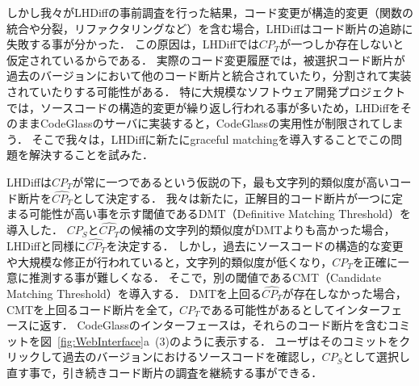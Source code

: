 しかし我々がLHDiffの事前調査を行った結果，コード変更が構造的変更（関数の統合や分裂，リファクタリングなど）を含む場合，LHDiffはコード断片の追跡に失敗する事が分かった．
この原因は，LHDiffでは$CP_T$が一つしか存在しないと仮定されているからである．
実際のコード変更履歴では，被選択コード断片が過去のバージョンにおいて他のコード断片と統合されていたり，分割されて実装されていたりする可能性がある．
特に大規模なソフトウェア開発プロジェクトでは，ソースコードの構造的変更が繰り返し行われる事が多いため，LHDiffをそのままCodeGlassのサーバに実装すると，CodeGlassの実用性が制限されてしまう．
そこで我々は，LHDiffに新たにgraceful matchingを導入することでこの問題を解決することを試みた．



LHDiffは$CP_T$が常に一つであるという仮説の下，最も文字列的類似度が高いコード断片を$\widehat{CP_T}$として決定する．
我々は新たに，正解目的コード断片が一つに定まる可能性が高い事を示す閾値であるDMT（Definitive Matching Threshold）を導入した．
$CP_{S}$と$\widehat{CP_T}$の候補の文字列的類似度がDMTよりも高かった場合，LHDiffと同様に$\widehat{CP_T}$を決定する．
しかし，過去にソースコードの構造的な変更や大規模な修正が行われていると，文字列的類似度が低くなり，$CP_{T}$を正確に一意に推測する事が難しくなる．
そこで，別の閾値であるCMT（Candidate Matching Threshold）を導入する．
DMTを上回る$\widehat{CP_T}$が存在しなかった場合，CMTを上回るコード断片を全て，$CP_{T}$である可能性があるとしてインターフェースに返す．
CodeGlassのインターフェースは，それらのコード断片を含むコミットを図~\ref{fig:WebInterface}a~(3)のように表示する．
ユーザはそのコミットをクリックして過去のバージョンにおけるソースコードを確認し，$CP_S$として選択し直す事で，引き続きコード断片の調査を継続する事ができる．



